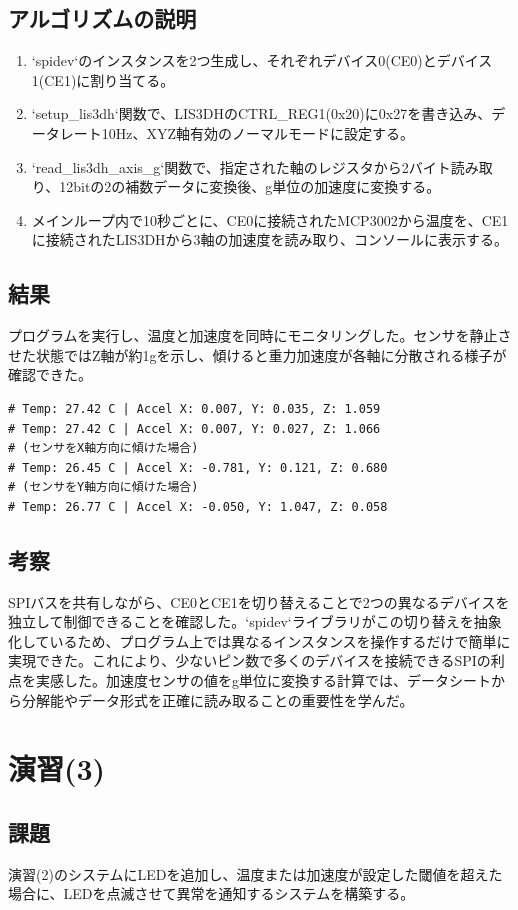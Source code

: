 \documentclass[a4paper,11pt,dvipdfmx]{jsarticle}
\begin{document}
\subsection{アルゴリズムの説明}
\begin{enumerate}
    \item `spidev`のインスタンスを2つ生成し、それぞれデバイス0(CE0)とデバイス1(CE1)に割り当てる。
    \item `setup\_lis3dh`関数で、LIS3DHのCTRL\_REG1(0x20)に0x27を書き込み、データレート10Hz、XYZ軸有効のノーマルモードに設定する。
    \item `read\_lis3dh\_axis\_g`関数で、指定された軸のレジスタから2バイト読み取り、12bitの2の補数データに変換後、g単位の加速度に変換する。
    \item メインループ内で10秒ごとに、CE0に接続されたMCP3002から温度を、CE1に接続されたLIS3DHから3軸の加速度を読み取り、コンソールに表示する。
\end{enumerate}

\subsection{結果}
プログラムを実行し、温度と加速度を同時にモニタリングした。センサを静止させた状態ではZ軸が約1gを示し、傾けると重力加速度が各軸に分散される様子が確認できた。
\begin{verbatim}
# Temp: 27.42 C | Accel X: 0.007, Y: 0.035, Z: 1.059
# Temp: 27.42 C | Accel X: 0.007, Y: 0.027, Z: 1.066
# (センサをX軸方向に傾けた場合)
# Temp: 26.45 C | Accel X: -0.781, Y: 0.121, Z: 0.680
# (センサをY軸方向に傾けた場合)
# Temp: 26.77 C | Accel X: -0.050, Y: 1.047, Z: 0.058
\end{verbatim}

\subsection{考察}
SPIバスを共有しながら、CE0とCE1を切り替えることで2つの異なるデバイスを独立して制御できることを確認した。`spidev`ライブラリがこの切り替えを抽象化しているため、プログラム上では異なるインスタンスを操作するだけで簡単に実現できた。これにより、少ないピン数で多くのデバイスを接続できるSPIの利点を実感した。加速度センサの値をg単位に変換する計算では、データシートから分解能やデータ形式を正確に読み取ることの重要性を学んだ。

\section{演習(3)}
\subsection{課題}
演習(2)のシステムにLEDを追加し、温度または加速度が設定した閾値を超えた場合に、LEDを点滅させて異常を通知するシステムを構築する。
\end{document}
